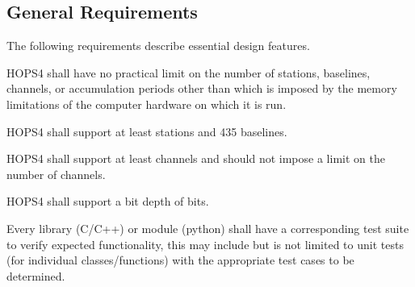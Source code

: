 %
%




\subsection{General Requirements}
\label{sec:genreq}

The following requirements describe essential design features.

\begin{description}

 HOPS4 shall have no practical limit on the number of stations,
baselines, channels, or accumulation periods other than which is imposed by the
memory limitations of the computer hardware on which it is run.

 HOPS4 shall support at least \FIX[30] stations and 435 baselines.

 HOPS4 shall support at least \FIX[128] channels and should not impose a
 limit on the number of channels.

 HOPS4 shall support a bit depth of \FIX[2] bits.

 Every library (C/C++) or module (python) shall have a corresponding
test suite to verify expected functionality, this may include but is not limited
to unit tests (for individual classes/functions) with the appropriate test
cases to be determined.


\end{description}

